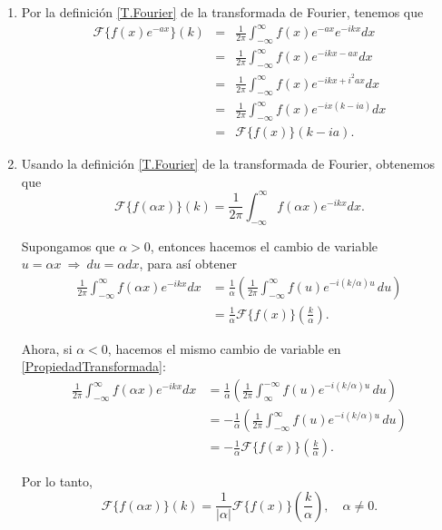 \begin{demo}
\begin{enumerate}
\item Por la definición \eqref{T.Fourier} de la transformada de Fourier, tenemos que
\begin{eqnarray*}
\mathcal{F}\{f(x) e^{-ax}\}(k) &=& \frac{1}{2\pi} \int_{-\infty}^{\infty} f(x) e^{-ax} e^{-ikx} dx \\
&=& \frac{1}{2\pi} \int_{-\infty}^{\infty} f(x) e^{-ikx-ax} dx \\
&=& \frac{1}{2\pi} \int_{-\infty}^{\infty} f(x) e^{-ikx+i^{2}ax} dx \\
&=& \frac{1}{2\pi} \int_{-\infty}^{\infty} f(x) e^{-ix(k-ia)} dx \\
&=&  \mathcal{F}\{f(x)\}(k-ia).
\end{eqnarray*}

\item Usando la definición \eqref{T.Fourier} de la transformada de Fourier, obtenemos que 
\begin{equation}
  \mathcal{F}\{f(\alpha x)\}(k) = \frac{1}{2\pi} \int_{-\infty}^{\infty} f(\alpha x) e^{-ikx} dx.   \label{PropiedadTransformada}
\end{equation}

Supongamos que $\alpha > 0$, entonces hacemos el cambio de variable $u = \alpha x ~\Rightarrow~ du = \alpha dx$, para así obtener
\begin{align*}
     \frac{1}{2\pi} \int_{-\infty}^{\infty} f(\alpha x) e^{-ikx} dx &= \frac{1}{\alpha} \left( \frac{1}{2\pi} \int_{-\infty}^{\infty} f(u) e^{-i(k/\alpha)u} \,du \right) \\
     &= \frac{1}{\alpha} \mathcal{F}\{f(x)\} \left(\frac{k}{\alpha} \right).
\end{align*}

Ahora, si $\alpha < 0$, hacemos el mismo cambio de variable  en \eqref{PropiedadTransformada}:
\begin{align*}
     \frac{1}{2\pi} \int_{-\infty}^{\infty} f(\alpha x) e^{-ikx} dx &= \frac{1}{\alpha} \left( \frac{1}{2\pi} \int_{\infty}^{-\infty} f(u) e^{-i(k/\alpha)u} \,du \right) \\
     &= - \frac{1}{\alpha} \left( \frac{1}{2\pi} \int_{-\infty}^{\infty} f(u) e^{-i(k/\alpha)u} \,du \right) \\
     &= -\frac{1}{\alpha} \mathcal{F}\{f(x)\} \left(\frac{k}{\alpha} \right).
\end{align*}

Por lo tanto, 
$$\mathcal{F}\{f(\alpha x)\}(k) = \frac{1}{|\alpha|}\mathcal{F}\{f(x)\}\left(\frac{k}{ \alpha}\right), \quad \alpha \neq 0.$$

\end{enumerate}
\end{demo}

